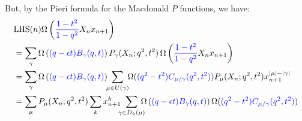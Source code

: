 \documentclass[12pt,dvips]{amsart}
\begin{document}
\medskip
\noindent
But, by the Pieri formula for the Macdonald $P$ functions, we have:
\begin{align*}
& \text{LHS}(n) \Omega \left ({\color{blue}\frac{1-t^2}{1-q^2}} X_n x_{n+1} \right ) \\
&= \sum_{ \gamma} \Omega \left ( {\color{blue}(q - \epsilon t) B_\gamma(q,t)}\right ) P_\gamma(X_n;q^2,t^2)\,\Omega \left ({\color{blue}\frac{1-t^2}{1-q^2}} X_n x_{n+1} \right ) \\
&= \sum_{ \gamma}  \Omega \left ( {\color{blue}(q - \epsilon t) B_\gamma(q,t)}\right ) \!\!\sum_{\mu \in U(\gamma)} \!\!\Omega ( {\color{blue}(q^2 - t^2) C_{\mu / \gamma}(q^2,t^2)}) P_\mu(X_n;q^2,t^2) x_{n+1}^{|\mu| - |\gamma|}  \\
&= \sum_\mu P_\mu(X_n;q^2,t^2) \sum_k x_{n+1}^k \!\!\!\sum_{\gamma \in D_k(\mu)}\!\!\!\! \Omega \left ( {\color{blue}(q - \epsilon t) B_\gamma(q,t)}\right ) \Omega ( {\color{blue}(q^2 - t^2) C_{\mu / \gamma}(q^2,t^2)} )
\end{align*}
\end{document}
